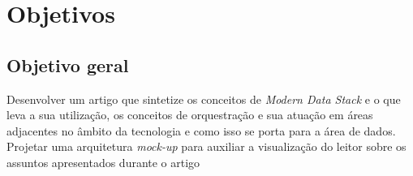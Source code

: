 
\section{Objetivos}\label{sec:objetivos}


\subsection{Objetivo geral}\label{subsec:objetivoGeral}




Desenvolver um artigo que sintetize os conceitos de \textit{Modern Data Stack} e o que leva a sua utilização, os conceitos de orquestração e sua atuação em áreas adjacentes no âmbito da tecnologia e como isso se porta para a área de dados. Projetar uma arquitetura \textit{mock-up} para auxiliar a visualização do leitor sobre os assuntos apresentados durante o artigo 





